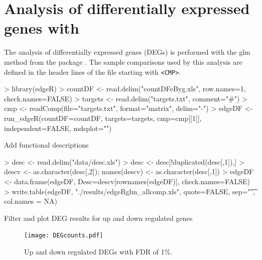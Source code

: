 \documentclass{article}
\begin{document}
\section{Analysis of differentially expressed genes with }
The analysis of differentially expressed genes (DEGs) is performed with the glm method from the  package \citep{Robinson2010-uk}. The sample comparisons used by this analysis are defined in the header lines of the \href{run:targets.txt}{} file starting with \texttt{<CMP>}.
\begin{Schunk}
\begin{Sinput}
> library(edgeR)
> countDF <- read.delim("countDFeByg.xls", row.names=1, check.names=FALSE) 
> targets <- read.delim("targets.txt", comment="#")
> cmp <- readComp(file="targets.txt", format="matrix", delim="-")
> edgeDF <- run_edgeR(countDF=countDF, targets=targets, cmp=cmp[[1]], independent=FALSE, mdsplot="")
\end{Sinput}
\end{Schunk}

Add functional descriptions
\begin{Schunk}
\begin{Sinput}
> desc <- read.delim("data/desc.xls") 
> desc <- desc[!duplicated(desc[,1]),]
> descv <- as.character(desc[,2]); names(descv) <- as.character(desc[,1])
> edgeDF <- data.frame(edgeDF, Desc=descv[rownames(edgeDF)], check.names=FALSE)
> write.table(edgeDF, "./results/edgeRglm_allcomp.xls", quote=FALSE, sep="\t", col.names = NA)
\end{Sinput}
\end{Schunk}

Filter and plot DEG results for up and down regulated genes
\begin{Schunk}
\end{Schunk}
\begin{figure}[H]
  \centering
   \texttt{[image: DEGcounts.pdf]}
   \caption{Up and down regulated DEGs with FDR of 1\%.}
   \label{fig:DEGcounts}
\end{figure}
\end{document}
